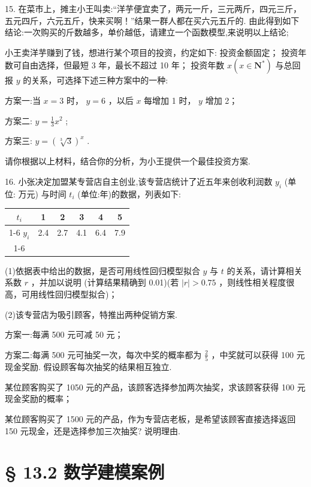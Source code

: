 15.    在菜市上，摊主小王叫卖:“洋芋便宜卖了，两元一斤，三元两斤，四元三斤，五元四斤，六元五斤，快来买啊！”结果一群人都在买六元五斤的. 由此得到如下结论:一次购买的斤数越多，单价越低，请建立一个函数模型,来说明以上结论;

  小王卖洋芋赚到了钱，想进行某个项目的投资，约定如下:  投资金额固定；  投资年数可自由选择，但最短 3 年，最长不超过 10 年；  投资年数 $x\left( {x \in  {\mathbf{N}}^{ * }}\right)$ 与总回报 $y$ 的关系，可选择下述三种方案中的一种:

方案一:当 $x = 3$ 时， $y = 6$ ，以后 $x$ 每增加 1 时， $y$ 增加 2；

方案二: $y = \frac{1}{3}{x}^{2}$ ;

方案三: $y = {\left( \sqrt[3]{3}\right) }^{x}$ .

请你根据以上材料，结合你的分析，为小王提供一个最佳投资方案.

16. 小张决定加盟某专营店自主创业,该专营店统计了近五年来创收利润数 ${y}_{i}$ (单位: 万元) 与时间 ${t}_{i}$ (单位:年)的数据，列表如下:

\begin{center}
\begin{tabular}{|c|c|c|c|c|c|}
\hline
${t}_{i}$ & 1 & 2 & 3 & 4 & 5 \\
\cline{1-6}
${y}_{i}$ & 2.4 & 2.7 & 4.1 & 6.4 & 7.9 \\
\cline{1-6}
\hline
\end{tabular}
\end{center}

(1)依据表中给出的数据，是否可用线性回归模型拟合 $y$ 与 $t$ 的关系，请计算相关系数 $r$ ，并加以说明 (计算结果精确到 0.01)(若 $\left| r\right|  > {0.75}$ ，则线性相关程度很高，可用线性回归模型拟合)；

(2)该专营店为吸引顾客，特推出两种促销方案.

方案一:每满 500 元可减 50 元；

方案二:每满 500 元可抽奖一次，每次中奖的概率都为 $\frac{2}{5}$ ，中奖就可以获得 100 元现金奖励. 假设顾客每次抽奖的结果相互独立.

  某位顾客购买了 1050 元的产品，该顾客选择参加两次抽奖，求该顾客获得 100 元现金奖励的概率；

  某位顾客购买了 1500 元的产品，作为专营店老板，是希望该顾客直接选择返回 150 元现金，还是选择参加三次抽奖? 说明理由.

\section*{§ 13.2 数学建模案例}

